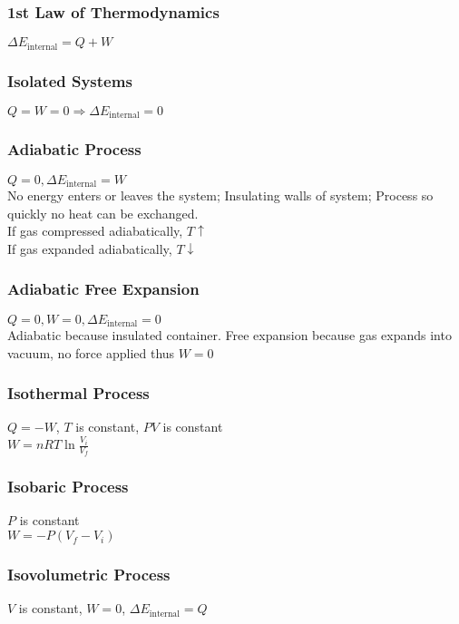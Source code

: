 \documentclass[10 pt]{article}
\begin{document}
\begin{multicols}{2}
\subsubsection*{1st Law of Thermodynamics}
$\Delta E_{\textrm{internal}} = Q + W$
\subsubsection*{Isolated Systems}
$Q = W = 0 \Rightarrow \Delta E_{\textrm{internal}} = 0$
\subsubsection*{Adiabatic Process}
$Q=0, \Delta E_{\textrm{internal}} = W$\\
No energy enters or leaves the system; Insulating walls of system; Process so quickly no heat can be exchanged.\\
If gas compressed adiabatically, $T \uparrow$ \\
If gas expanded adiabatically, $T \downarrow$
\subsubsection*{Adiabatic Free Expansion}
$Q=0, W=0, \Delta E_{\textrm{internal}} = 0$ \\
Adiabatic because insulated container. Free expansion because gas expands into vacuum, no force applied thus $W=0$
\subsubsection*{Isothermal Process}
$Q = -W$, $T$ is constant, $PV$ is constant \\
\indent $\displaystyle W = nRT \ln{\frac{V_i}{V_f}}$
\subsubsection*{Isobaric Process}
$P$ is constant \\
\indent $W = -P(V_f - V_i)$
\subsubsection*{Isovolumetric Process}
$V$ is constant, $W=0$, $\Delta E_{\textrm{internal}} = Q$
\end{multicols}
\end{document}
